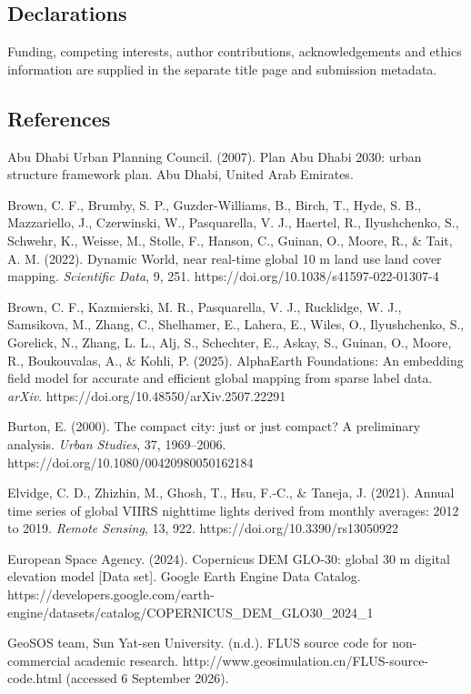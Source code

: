 \subsection{Declarations}\label{declarations}

Funding, competing interests, author contributions, acknowledgements and
ethics information are supplied in the separate title page and
submission metadata.

\subsection{References}\label{references}

Abu Dhabi Urban Planning Council. (2007). Plan Abu Dhabi 2030: urban
structure framework plan. Abu Dhabi, United Arab Emirates.

Brown, C. F., Brumby, S. P., Guzder-Williams, B., Birch, T., Hyde, S.
B., Mazzariello, J., Czerwinski, W., Pasquarella, V. J., Haertel, R.,
Ilyushchenko, S., Schwehr, K., Weisse, M., Stolle, F., Hanson, C.,
Guinan, O., Moore, R., \& Tait, A. M. (2022). Dynamic World, near
real-time global 10 m land use land cover mapping. \emph{Scientific
Data}, 9, 251. https://doi.org/10.1038/s41597-022-01307-4

Brown, C. F., Kazmierski, M. R., Pasquarella, V. J., Rucklidge, W. J.,
Samsikova, M., Zhang, C., Shelhamer, E., Lahera, E., Wiles, O.,
Ilyushchenko, S., Gorelick, N., Zhang, L. L., Alj, S., Schechter, E.,
Askay, S., Guinan, O., Moore, R., Boukouvalas, A., \& Kohli, P. (2025).
AlphaEarth Foundations: An embedding field model for accurate and
efficient global mapping from sparse label data. \emph{arXiv}.
https://doi.org/10.48550/arXiv.2507.22291

Burton, E. (2000). The compact city: just or just compact? A preliminary
analysis. \emph{Urban Studies}, 37, 1969--2006.
https://doi.org/10.1080/00420980050162184

Elvidge, C. D., Zhizhin, M., Ghosh, T., Hsu, F.-C., \& Taneja, J.
(2021). Annual time series of global VIIRS nighttime lights derived from
monthly averages: 2012 to 2019. \emph{Remote Sensing}, 13, 922.
https://doi.org/10.3390/rs13050922

European Space Agency. (2024). Copernicus DEM GLO-30: global 30 m
digital elevation model {[}Data set{]}. Google Earth Engine Data
Catalog.
https://developers.google.com/earth-engine/datasets/catalog/COPERNICUS\_DEM\_GLO30\_2024\_1

GeoSOS team, Sun Yat-sen University. (n.d.). FLUS source code for
non-commercial academic research.
http://www.geosimulation.cn/FLUS-source-code.html (accessed 6 September
2026).

